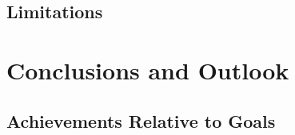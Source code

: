 


\subsection{Limitations}

\newpage
\section{Conclusions and Outlook}

\subsection{Achievements Relative to Goals}

